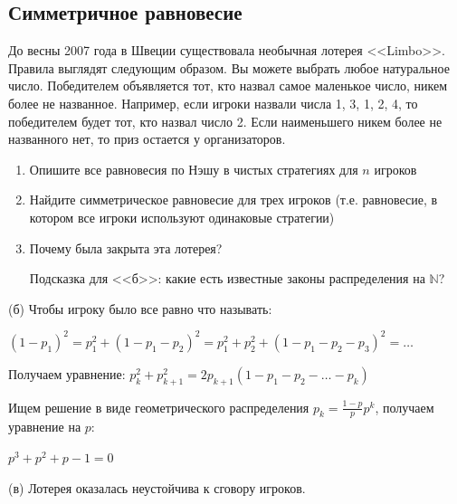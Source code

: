 \subsection{Симметричное равновесие}

\begin{problem}[Limbo.]
До весны 2007 года в Швеции существовала необычная лотерея <<Limbo>>. Правила выглядят следующим образом. Вы можете выбрать любое натуральное число. Победителем объявляется тот, кто назвал самое маленькое число, никем более не названное. Например, если игроки назвали числа 1, 3, 1, 2, 4, то победителем будет тот, кто назвал число 2. Если наименьшего никем более не названного нет, то приз остается у организаторов. \par
\begin{enumerate}
\item  Опишите все равновесия по Нэшу в чистых стратегиях для $n$ игроков \par
\item Найдите симметрическое равновесие для трех игроков (т.е. равновесие, в котором все игроки используют одинаковые стратегии) \par
\item  Почему была закрыта эта лотерея? \par
Подсказка для <<б>>: какие есть известные законы распределения на $\mathbb{N}$?
\end{enumerate}

\begin{sol}

(б)
Чтобы игроку было все равно что называть:

$(1-p_1)^2 = p_1^2+(1-p_1-p_2)^2 = p_1^2+p_2^2+(1-p_1-p_2-p_3)^2 =\ldots $

Получаем уравнение:
$p_{k}^{2}+p_{k+1}^{2}=2p_{k+1}(1-p_{1}-p_{2}-\ldots -p_{k})$

Ищем решение в виде геометрического распределения $p_{k}=\frac{1-p}{p}p^{k}$, получаем уравнение на $p$:\par
$p^{3}+p^{2}+p-1=0$ \par

(в)  Лотерея оказалась неустойчива к сговору игроков.
\end{sol}
\end{problem}



